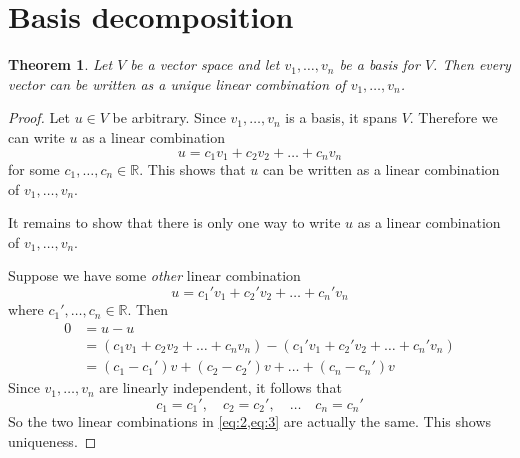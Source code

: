 \documentclass[10pt]{article}
\newtheorem{theorem}{Theorem}
\theoremstyle{definition}
\newcommand{\R}{\mathbb{R}}           %
\begin{document}
\section{Basis decomposition}
\begin{theorem}
  Let $V$ be a vector space and let $v_{1},\ldots,v_{n}$ be a basis for $V$.
  Then every vector can be written as a unique linear combination
  of $v_{1},\ldots,v_{n}$.
\end{theorem}
\begin{proof}
  Let $u\in V$ be arbitrary. Since $v_{1},\ldots,v_{n}$ is a basis, it spans
  $V$. Therefore we can write $u$ as a linear combination
  \begin{equation}\label{eq:2}
    u = c_{1}v_{1}+c_{2}v_{2}+\ldots+c_{n}v_{n}
  \end{equation}
  for some $c_{1},\ldots,c_{n}\in \R$. This shows that $u$ can be written as a
  linear combination of $v_{1},\ldots,v_{n}$.

  It remains to show that there is only one way to write $u$ as a linear
  combination of $v_{1},\ldots,v_{n}$.

  Suppose we have some \textit{other} linear combination
  \begin{equation}\label{eq:3}
    u = c_{1}'v_{1}+c_{2}'v_{2}+\ldots+c_{n}'v_{n}
  \end{equation}
  where $c_{1}',\ldots,c_{n}\in \R$. Then
  \begin{align*}
    0 
    &= u-u\\
    &= \left(  c_{1}v_{1}+c_{2}v_{2}+\ldots+c_{n}v_{n} \right) - \left(  c_{1}'v_{1}+c_{2}'v_{2}+\ldots+c_{n}'v_{n} \right)\\ 
    &= (c_{1}-c_{1}')v+(c_{2}-c_{2}')v+\ldots+ (c_{n}-c_{n}')v
  \end{align*}
  Since $v_{1},\ldots,v_{n}$ are linearly independent, it follows that
  \begin{equation*}
    c_{1}=c_{1}', \quad c_{2}=c_{2}',\quad \ldots \quad c_{n}=c_{n}'
  \end{equation*}
  So the two linear combinations in \cref{eq:2,eq:3} are actually the same.
  This shows uniqueness.
\end{proof}
\end{document}
